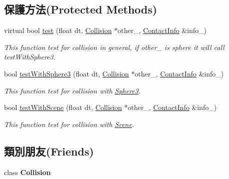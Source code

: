 \subsection*{保護方法(Protected Methods)}
\begin{DoxyCompactItemize}
\item 
virtual bool \hyperlink{class_magnum_1_1_sphere3_collision_a401bddbc02cbbe9aeb8ab9b536aba7fb}{test} (float dt, \hyperlink{class_magnum_1_1_collision}{Collision} $\ast$other\+\_\+, \hyperlink{class_magnum_1_1_collision_1_1_contact_info}{Contact\+Info} \&info\+\_\+)
\begin{DoxyCompactList}\small\item\em This function test for collision in general, if other\+\_\+ is sphere it will call test\+With\+Sphere3. \end{DoxyCompactList}\item 
bool \hyperlink{class_magnum_1_1_sphere3_collision_a7d3bd58c5d443ca38cfc060057298be6}{test\+With\+Sphere3} (float dt, \hyperlink{class_magnum_1_1_collision}{Collision} $\ast$other\+\_\+, \hyperlink{class_magnum_1_1_collision_1_1_contact_info}{Contact\+Info} \&info\+\_\+)
\begin{DoxyCompactList}\small\item\em This function test for collision with \hyperlink{class_magnum_1_1_sphere3}{Sphere3}. \end{DoxyCompactList}\item 
bool \hyperlink{class_magnum_1_1_sphere3_collision_a412a102d642fd2e0d55cbeb882ff83a3}{test\+With\+Scene} (float dt, \hyperlink{class_magnum_1_1_collision}{Collision} $\ast$other\+\_\+, \hyperlink{class_magnum_1_1_collision_1_1_contact_info}{Contact\+Info} \&info\+\_\+)
\begin{DoxyCompactList}\small\item\em This function test for collision with \hyperlink{class_magnum_1_1_scene}{Scene}. \end{DoxyCompactList}\end{DoxyCompactItemize}
\subsection*{類別朋友(Friends)}
\begin{DoxyCompactItemize}
\item 
class {\bfseries Collision}\hypertarget{class_magnum_1_1_sphere3_collision_aa08e39e5a8a0a97f10c15f0c5d98013b}{}\label{class_magnum_1_1_sphere3_collision_aa08e39e5a8a0a97f10c15f0c5d98013b}

\end{DoxyCompactItemize}
